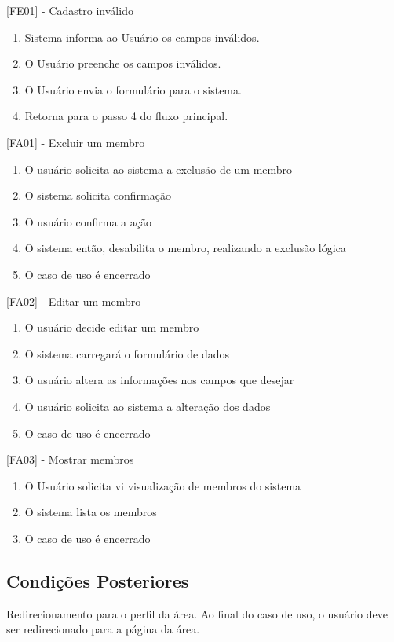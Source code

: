 [FE01] - Cadastro inválido
\begin{enumerate}
  \item{Sistema informa ao Usuário os campos inválidos.}
  \item{O Usuário preenche os campos inválidos.}
  \item{O Usuário envia o formulário para o sistema.}
  \item{Retorna para o passo 4 do fluxo principal.}
\end{enumerate}


[FA01] - Excluir um membro
\begin{enumerate}
  \item{O usuário solicita ao sistema a exclusão de um membro}
  \item{O sistema solicita confirmação}
  \item{O usuário confirma a ação}
  \item{O sistema então, desabilita o membro, realizando a exclusão lógica}
  \item{O caso de uso é encerrado}
\end{enumerate}


[FA02] - Editar um membro
\begin{enumerate}
  \item{O usuário decide editar um membro}
  \item{O sistema carregará o formulário de dados}
  \item{O usuário altera as informações nos campos que desejar}
  \item{O usuário solicita ao sistema a alteração dos dados}
  \item{O caso de uso é encerrado}
\end{enumerate}



[FA03] - Mostrar membros
\begin{enumerate}
  \item{O Usuário solicita vi visualização de membros do sistema}
  \item{O sistema lista os membros}
  \item{O caso de uso é encerrado}
\end{enumerate}


\subsection{Condições Posteriores}

Redirecionamento para o perfil da área. Ao final do caso de uso, o usuário deve ser redirecionado para a página da área.


